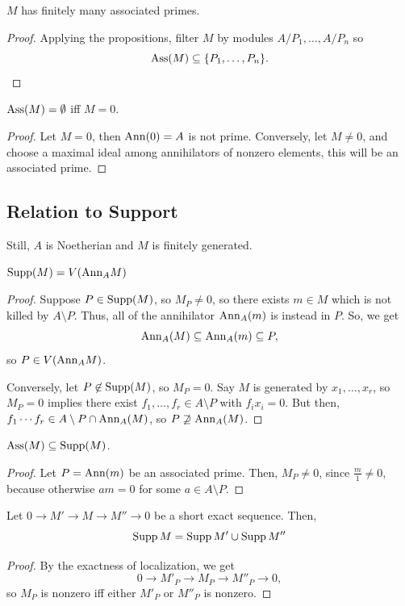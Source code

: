 \documentclass[12pt]{article}
\begin{document}
\begin{prop}
    $M$ has finitely many associated primes.
\end{prop}
\begin{proof}
    Applying the propositions, filter $M$ by modules $A/P_1,\dots,A/P_n$ so
    \[\operatorname{Ass}(M) \subseteq \{P_1,\dots,P_n\}.\]
\end{proof}

\begin{prop}
    $\operatorname{Ass}(M)=\emptyset$ iff $M=0$.
\end{prop}

\begin{proof}
    Let $M=0$, then $\mathrm{Ann}(0)=A$ is not prime. Conversely, let $M\neq 0$, and choose a maximal ideal among annihilators of nonzero elements, this will be an associated prime.
\end{proof}

\subsection{Relation to Support}

Still, $A$ is Noetherian and $M$ is finitely generated.

\begin{prop}
    $\operatorname{Supp}(M) = V(\mathrm{Ann}_A M)$
\end{prop}
\begin{proof}
    Suppose $P\in \operatorname{Supp}(M)$, so $M_P\neq 0$, so there exists $m\in M$ which is not killed by $A\setminus P$. Thus, all of the annihilator $\mathrm{Ann}_A(m)$ is instead in $P$. So, we get
    \[\mathrm{Ann}_A(M) \subseteq \mathrm{Ann}_A(m) \subseteq P,\]
    so $P\in V(\mathrm{Ann}_A M)$.

    Conversely, let $P\not\in \operatorname{Supp}(M)$, so $M_P=0$. Say $M$ is generated by $x_1,\dots,x_r$, so $M_P=0$ implies there exist $f_1,\dots,f_r\in A\setminus P$ with $f_i x_i=0$. But then, $f_1\cdots f_r \in A\setminus P \cap \mathrm{Ann}_A(M)$, so $P\not\supseteq \mathrm{Ann}_A(M)$.
\end{proof}

\begin{prop}
    $\operatorname{Ass}(M) \subseteq \operatorname{Supp}(M)$.
\end{prop}
\begin{proof}
    Let $P=\mathrm{Ann}(m)$ be an associated prime. Then, $M_P\neq 0$, since $\frac{m}{1}\neq 0$, because otherwise $am=0$ for some $a\in A\setminus P$.
\end{proof}

\begin{prop}
    Let $0\to M'\to M\to M''\to 0$ be a short exact sequence. Then,
    \[\operatorname{Supp} M = \operatorname{Supp} M' \cup \operatorname{Supp} M''\]
\end{prop}
\begin{proof}
    By the exactness of localization, we get
    \[0 \to M'_P \to M_P \to M''_P \to 0,\]
    so $M_P$ is nonzero iff either $M'_P$ or $M''_P$ is nonzero.
\end{proof}
\end{document}
